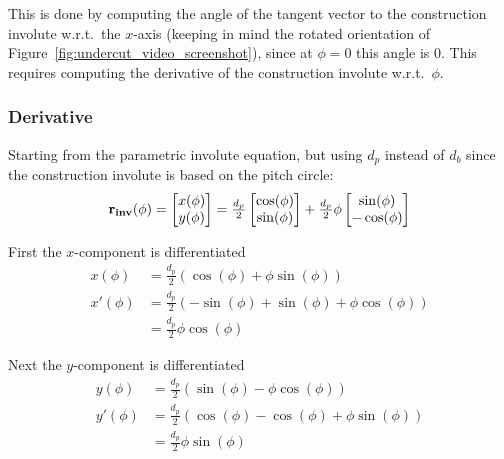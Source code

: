 This is done by computing the angle of the tangent vector to the construction involute w.r.t.\ the $x$-axis (keeping in mind the rotated orientation of Figure~\ref{fig:undercut_video_screenshot}), since at $\phi=0$ this angle is $0$. This requires computing the derivative of the construction involute w.r.t.\ $\phi$.

\subsubsection{Derivative}
Starting from the parametric involute equation, but using $d_p$ instead of $d_b$ since the construction involute is based on the pitch circle:
\begin{equation}
    \vb{r_{inv}}(\phi) =
        \begin{bmatrix}
            x(\phi) \\
            y(\phi)
        \end{bmatrix}
        = \tfrac{d_p}{2} \begin{bmatrix}
                \cos(\phi) \\
                \sin(\phi)
            \end{bmatrix}
            + \tfrac{d_p}{2}\phi \begin{bmatrix}
                \sin(\phi) \\
                -\cos(\phi)
            \end{bmatrix}
\end{equation}

First the $x$-component is differentiated
\begin{subequations}
\begin{align}
    x(\phi)     &= \frac{d_p}{2}(\cos(\phi) + \phi \sin(\phi))\\
    x'(\phi)    &= \frac{d_p}{2}(-\sin(\phi) + \sin(\phi) + \phi\cos(\phi)) \\
                &= \frac{d_p}{2}\phi\cos(\phi)
\end{align}
\end{subequations}

Next the $y$-component is differentiated
\begin{subequations}
\begin{align}
    y(\phi)     &= \frac{d_p}{2}(\sin(\phi) - \phi \cos(\phi))\\
    y'(\phi)    &= \frac{d_p}{2}(\cos(\phi) - \cos(\phi) + \phi\sin(\phi)) \\
                &= \frac{d_p}{2}\phi\sin(\phi)
\end{align}
\end{subequations}

